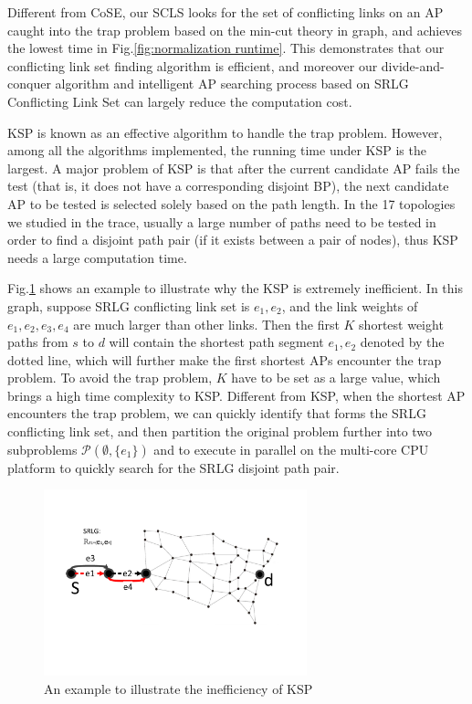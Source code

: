 Different from CoSE, our SCLS looks for the set of conflicting links on an AP caught into the trap problem based on the min-cut theory in graph, and achieves the lowest time in Fig.\ref{fig:normalization runtime}. This demonstrates that our conflicting link set finding algorithm is efficient, and moreover our divide-and-conquer algorithm and intelligent AP searching process based on SRLG Conflicting Link Set can largely reduce the computation cost.

KSP is known as an effective algorithm to handle the trap problem. However, among all the algorithms implemented, the running time under KSP is the largest. A major problem of KSP is that after the current candidate AP fails the test (that is, it does not have a corresponding disjoint BP), the next candidate AP to be tested is selected solely based on the path length. In the 17 topologies we studied in the trace,  usually a large number of paths need to be tested in order to find a disjoint path pair (if it exists between a pair of nodes), thus KSP needs a large computation time.

Fig.\ref{fig:KSPproblem}  shows an example to illustrate why the KSP is extremely inefficient. In this graph, suppose SRLG conflicting link set is ${e_1,e_2}$, and the link weights of $e_1, e_2, e_3, e_4$ are much larger than other links. Then the first $K$ shortest weight paths from $s$ to $d$ will contain the shortest path segment $e_1,e_2$ denoted by the dotted line, which will further make the first shortest APs encounter the trap problem. To avoid the trap problem, $K$ have to be set as a large value, which brings a high time complexity to KSP. Different from KSP, when the shortest AP encounters the trap problem, we can quickly identify that  forms the SRLG conflicting link set, and then partition the original problem further into two subproblems $\mathcal{P}(\emptyset,\{e_1\})$ and  to execute in parallel on the multi-core CPU platform to quickly search for the SRLG disjoint path pair.

\begin{figure}[tp]
\centering
\includegraphics[width=3in]{franz/KSPproblem}
  \caption{An example to illustrate the inefficiency of KSP}
  \label{fig:KSPproblem}
\end{figure}

